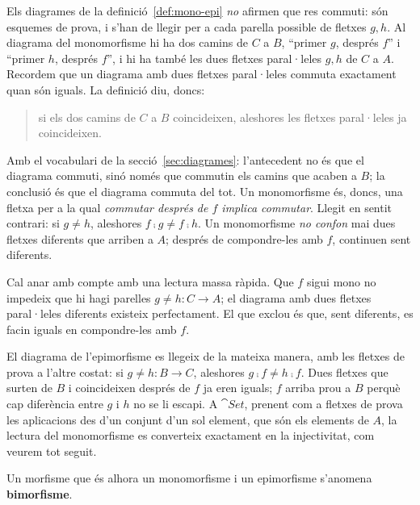 \begin{observacio}\label{obs:llegir-mono-epi}
Els diagrames de la definició~\ref{def:mono-epi} \emph{no} afirmen que res commuti: són esquemes de prova, i s'han de llegir per a cada parella possible de fletxes $g,h$. Al diagrama del monomorfisme hi ha dos camins de $C$ a $B$, \enquote{primer $g$, després $f$} i \enquote{primer $h$, després $f$}, i hi ha també les dues fletxes paral·leles $g,h$ de $C$ a $A$. Recordem que un diagrama amb dues fletxes paral·leles commuta exactament quan són iguals. La definició diu, doncs:
\begin{quote}
si els dos camins de $C$ a $B$ coincideixen, aleshores les fletxes paral·leles ja coincideixen.
\end{quote}
Amb el vocabulari de la secció~\ref{sec:diagrames}: l'antecedent no és que el diagrama commuti, sinó només que commutin els camins que acaben a $B$; la conclusió és que el diagrama commuta del tot. Un monomorfisme és, doncs, una fletxa per a la qual \emph{commutar després de $f$ implica commutar}.
Llegit en sentit contrari: si $g\neq h$, aleshores $f\comp g\neq f\comp h$. Un monomorfisme \emph{no confon} mai dues fletxes diferents que arriben a $A$; després de compondre-les amb $f$, continuen sent diferents.

Cal anar amb compte amb una lectura massa ràpida. Que $f$ sigui mono no impedeix que hi hagi parelles $g\neq h\colon C\to A$; el diagrama amb dues fletxes paral·leles diferents existeix perfectament. El que exclou és que, sent diferents, es facin iguals en compondre-les amb $f$.

El diagrama de l'epimorfisme es llegeix de la mateixa manera, amb les fletxes de prova a l'altre costat: si $g\neq h\colon B\to C$, aleshores $g\comp f\neq h\comp f$. Dues fletxes que surten de $B$ i coincideixen després de $f$ ja eren iguals; $f$ arriba prou a $B$ perquè cap diferència entre $g$ i $h$ no se li escapi. A $\cat{Set}$, prenent com a fletxes de prova les aplicacions des d'un conjunt d'un sol element, que són els elements de $A$, la lectura del monomorfisme es converteix exactament en la injectivitat, com veurem tot seguit.
\end{observacio}

\begin{definicio}
Un morfisme que és alhora un monomorfisme i un epimorfisme s'anomena \textbf{bimorfisme}.
\end{definicio}

